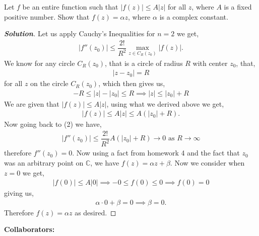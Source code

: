 \documentclass[11pt]{article}
\newenvironment{problem}[2][Problem\!]{\begin{trivlist}
\item[\hskip \labelsep {\bfseries #1}\hskip \labelsep {\bfseries #2}]}{\end{trivlist}}
\newenvironment{solution}{\begin{proof}[\textbf{\textit{Solution}}] }{\end{proof}}
\newcommand{\cc}{\mathbb C}   %
\newcommand{\abs}[1]{\left\lvert#1\right\rvert} %
\renewcommand{\leq}{\leqslant}
\begin{document}
\begin{problem}{8.5}
Let $f$ be an entire function such that $\abs{f(z)} \leq A\abs{z}$ for all $z$, where $A$ is a fixed positive number. Show that $f(z) = \alpha z$, where $\alpha$ is a complex constant.
\end{problem}
\begin{solution}
    Let us apply Cauchy's Inequalities for $n =2$ we get,
    \begin{align}
        \abs{f''(z_0)} \leq \dfrac{2!}{R^{2}}\max_{z\in C_R(z_0)}\abs{f(z)}.
    \end{align}
    We know for any circle $C_R(z_0)$, that is a circle of radius $R$ with center $z_0$, that,
    \begin{align*}
        \abs{z - z_0} = R
    \end{align*}
    for all $z$ on the circle $C_R(z_0)$, which then gives us,
    \begin{align*}
        -R \leq \abs{z} -\abs{z_0} \leq R \implies \abs{z} \leq \abs{z_0} + R
    \end{align*}
    We are given that $\abs{f(z)} \leq A\abs{z}$, using what we derived above we get,
    \begin{align*}
        \abs{f(z)} \leq A\abs{z} \leq A(\abs{z_0} + R).
    \end{align*}
    Now going back to (2) we have,
    \begin{align*}
        \abs{f''(z_0)} \leq \dfrac{2!}{R^{2}}A(\abs{z_0} + R) \to 0  \text{ as } R\to \infty 
    \end{align*}
    therefore $f''(z_0)= 0 $. Now using a fact from homework 4 and the fact that $z_0$ was an arbitrary point on $\cc$, we have $f(z) = \alpha z + \beta$. Now we consider when $z =0$ we get,
    \begin{align*}
        \abs{f(0)} \leq A\abs{0} \implies
        -0 \leq f(0) \leq 0 \implies f(0) = 0
    \end{align*}
    giving us,
    \begin{align*}
        \alpha\cdot 0 + \beta = 0 \implies \beta = 0.
    \end{align*}
    Therefore $f(z) = \alpha z$ as desired. 
\end{solution}


\newpage  %

\begin{center}
\textbf{Collaborators:}
\end{center}
\vfill 
\end{document}
